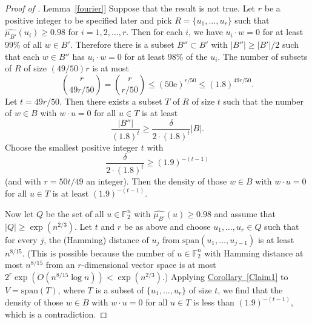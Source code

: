 \documentclass[11pt]{article}
\numberwithin{equation}{section}
\theoremstyle{definition}
\theoremstyle{plain}
\newcommand{\eee}{\mathrm e}
\newcommand{\expref}[2]{\hyperref[#2]{#1~\ref{#2}}}
\begin{document}
\begin{proof}[Proof of \expref{Lemma}{fourier}]
  Suppose that the result is not true. Let $r$ be a positive integer
  to be specified later and pick $R=\{u_1,\dots,u_r\}$ such that
  $\widehat{\mu_{B'}}(u_i)\geq 0.98$ for $i=1,2,\dots,r$. Then for
  each $i$, we have $u_i\cdot w=0$ for at least 99\% of all $w\in
  B'$. Therefore there is a subset $B''\subset B'$ with
  $|B''|\geq |B'|/2$ such that each $w\in B''$ has $u_i\cdot w=0$ for
  at least 98\% of the $u_i$. The number of subsets of $R$ of size
  $({49}/{50})r$ is at most
  \[
    \binom{r}{49r/50}=\binom{r}{r/50}\leq (50\eee)^{r/50}\leq (1.8)^{49r/50}.
  \]
  Let $t=49r/50$. Then there exists a subset $T$ of $R$ of size $t$
  such that the number of $w\in B$ with $w\cdot u=0$ for all $u\in T$
  is at least
  \[
    \frac{|B''|}{(1.8)^t}\geq \frac{\delta}{2\cdot (1.8)^t}|B|.
  \]
  Choose the smallest positive integer $t$ with
  \[
    \frac{\delta}{2\cdot (1.8)^t}\geq (1.9)^{-(t-1)}
  \]
  (and with $r=50t/49$ an integer). Then the density of those $w\in B$
  with $w\cdot u=0$ for all $u\in T$ is at least $(1.9)^{-(t-1)}$.
	
	Now let $Q$ be the set of all $u\in \mathbb{F}_2^n$ with $\widehat{\mu_{B'}}(u)\geq 0.98$ and assume that $|Q|\geq \exp(n^{2/3})$. Let $t$ and $r$ be as above and choose $u_1,\dots,u_r\in Q$ such that for every $j$, the (Hamming) distance of $u_j$ from $\text{span}(u_1,\dots,u_{j-1})$ is at least $n^{8/15}$. (This is possible because the number of $u\in \mathbb{F}_2^n$ with Hamming distance at most $n^{8/15}$ from an $r$-dimensional vector space is at most $2^r \exp(O(n^{8/15}\log n))<\exp(n^{2/3})$.) Applying \expref{Corollary}{Claim1} to $V=\text{span}(T)$, where $T$ is a subset of $\{u_1,\dots,u_r\}$ of size $t$, we find that the density of those $w\in B$ with $w\cdot u=0$ for all $u\in T$ is less than $(1.9)^{-(t-1)}$, which is a contradiction. 
\end{proof}
\end{document}
